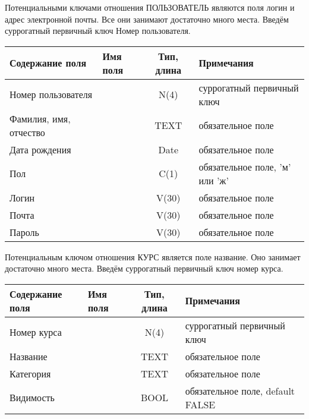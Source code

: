 \documentclass[a4paper,14pt]{article}
\begin{document}

Потенциальными ключами отношения ПОЛЬЗОВАТЕЛЬ являются поля логин и адрес электронной почты. Все они занимают достаточно много места. Введём суррогатный первичный ключ Номер пользователя.

\begin{table}[H]
\begin{tabular}{|l|l|c|l|}
	\hline
	Содержание поля        & Имя поля & Тип, длина & Примечания                     \\ \hline
	Номер пользователя     &          &    N(4)    & суррогатный первичный ключ     \\ \hline
	Фамилия, имя, отчество &          &    TEXT    & обязательное поле              \\ \hline
	Дата рождения          &          &    Date    & обязательное поле              \\ \hline
	Пол                    &          &    C(1)    & обязательное поле, 'м' или 'ж' \\ \hline
	Логин                  &          &   V(30)    & обязательное поле              \\ \hline
	Почта                  &          &   V(30)    & обязательное поле              \\ \hline
	Пароль                 &          &   V(30)    & обязательное поле              \\ \hline
\end{tabular}
\end{table}


Потенциальным ключом отношения КУРС является поле название. Оно занимает достаточно много места. Введём суррогатный первичный ключ номер курса.

\begin{table}[H]
	\begin{tabular}{|l|l|c|l|}
		\hline
		Содержание поля & Имя поля & Тип, длина & Примечания                       \\ \hline
		Номер курса     &          &    N(4)    & суррогатный первичный ключ       \\ \hline
		Название        &          &    TEXT    & обязательное поле                \\ \hline
		Категория       &          &    TEXT    & обязательное поле                \\ \hline
		Видимость       &          &    BOOL    & обязательное поле, default FALSE \\ \hline
	\end{tabular}
\end{table}
\end{document}
